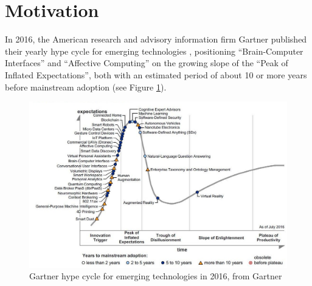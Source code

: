 \section{Motivation}
\label{sec:motivation}
In 2016, the American research and advisory information firm Gartner published their yearly hype cycle for emerging 
technologies , positioning “Brain-Computer Interfaces” and “Affective Computing” on the growing slope of the “Peak of Inflated Expectations”, both with an estimated period of about 10 or more years before mainstream adoption (see Figure \ref{fig_hype_cycle}).
\begin{figure}[h]
\includegraphics[width=\textwidth]{img/intro/hype_curve_trim.jpg}
\caption{Gartner hype cycle for emerging technologies in 2016, from Gartner\cite{noauthor_gartners_nodate}}\label{fig_hype_cycle}
\end{figure}
